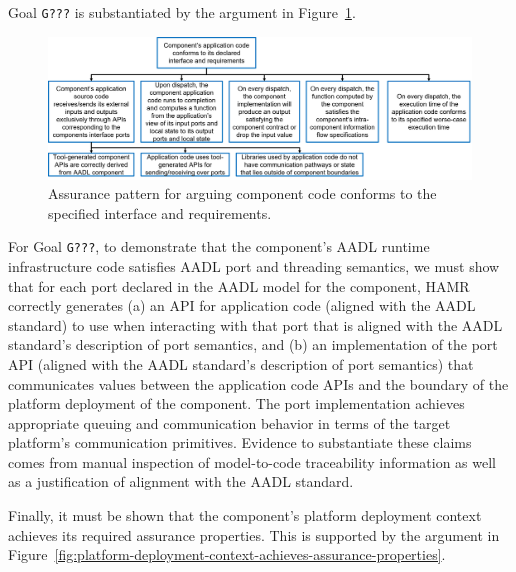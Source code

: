 Goal \texttt{G???} is substantiated by the argument in Figure~\ref{fig:code-conforms-to-interface-and-requirements}.

\begin{figure}[h]
	\centering 
	\includegraphics[width=\textwidth]{figs/code-conforms-to-interface-and-requirements.png}
	\caption{Assurance pattern for arguing component code conforms to the specified interface and requirements.}
	\label{fig:code-conforms-to-interface-and-requirements} 
\end{figure}

For Goal \texttt{G???}, to demonstrate that the component's AADL runtime infrastructure code satisfies AADL port and threading semantics, we must show that
for each port declared in the AADL model for the component, HAMR correctly generates 
(a) an API for application code (aligned with the AADL standard) to use when interacting with that port that is aligned with the AADL standard's description of port semantics, and
(b) an implementation of the port API (aligned with the AADL standard's description of port semantics) that communicates values between the application code APIs and the boundary of the platform deployment of the component.  The port implementation achieves appropriate queuing and communication behavior in terms of the target platform's communication primitives.
Evidence to substantiate these claims comes from manual inspection of model-to-code traceability information as well as a justification of alignment with the AADL standard.

Finally, it must be shown that the component's platform deployment context achieves its required assurance properties.  This is supported by the argument in Figure~\ref{fig:platform-deployment-context-achieves-assurance-properties}.

